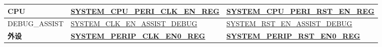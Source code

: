 \documentclass[main\_\_CN.tex]{subfiles}
\begin{document}
\begin{ThreePartTable}
\begin{longtable}[c]{ |l|l|l| }


    \textbf{CPU} & \textbf{\hyperref[regdesc:SYSTEMCPUPERICLKENREG]{SYSTEM\_CPU\_PERI\_CLK\_EN\_REG}} & \textbf{\hyperref[regdesc:SYSTEMCPUPERIRSTENREG]{SYSTEM\_CPU\_PERI\_RST\_EN\_REG}} \\ \hline
    DEBUG\_ASSIST & \hyperref[fielddesc:SYSTEMCLKENASSISTDEBUG]{SYSTEM\_CLK\_EN\_ASSIST\_DEBUG} & \hyperref[fielddesc:SYSTEMRSTENASSISTDEBUG]{SYSTEM\_RST\_EN\_ASSIST\_DEBUG} \\\hline


    \textbf{外设} & \textbf{\hyperref[regdesc:SYSTEMPERIPCLKEN0REG]{SYSTEM\_PERIP\_CLK\_EN0\_REG}} &  \textbf{\hyperref[regdesc:SYSTEMPERIPRSTEN0REG]{SYSTEM\_PERIP\_RST\_EN0\_REG}} \\ \hline


\end{longtable}
\end{ThreePartTable}
\end{document}
